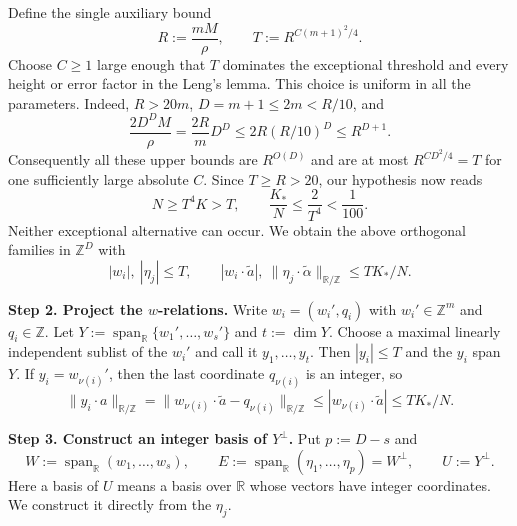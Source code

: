 \documentclass[twoside]{aomart}
\makeatletter
\theoremstyle{paperplain}
\theoremstyle{paperdefinition}
\renewenvironment{proof}[1][\proofname]{\par\pushQED{\qed}%
  \normalfont\topsep6\p@\@plus3\p@\relax\trivlist
  \item[\hskip\labelsep\itshape #1\@addpunct{.}]\ignorespaces
}{\popQED\endtrivlist\@endpefalse}
\numberwithin{equation}{section}
\makeatother
\begin{document}
\begin{proof}
Define the single auxiliary bound
\begin{equation*}
 R:=\frac{mM}{\rho},\qquad T:=R^{C(m+1)^2/4}.
\end{equation*}
Choose $C\ge1$ large enough that $T$ dominates the exceptional
threshold and every height or error factor in the Leng's lemma.
This choice is uniform in all the parameters. Indeed, $R>20m$,
$D=m+1\le2m<R/10$, and
\begin{equation*}
 \frac{2D^DM}{\rho}
 =\frac{2R}{m}D^D
 \le 2R(R/10)^D\le R^{D+1}.
\end{equation*}
Consequently all these upper bounds are $R^{O(D)}$ and are
at most $R^{CD^2/4}=T$ for one sufficiently large absolute $C$.
Since $T\ge R>20$, our hypothesis now reads
\begin{equation*}
 N\ge T^4K>T,\qquad \frac{K_*}{N}\le\frac2{T^4}<\frac1{100}.
\end{equation*}
Neither exceptional alternative can occur. We obtain the above
orthogonal families in $\mathbb Z^D$ with
\begin{equation}
 |w_i|,\ |\eta_j|\le T,\qquad
 |w_i\cdot\widetilde a|,\
 \|\eta_j\cdot\widetilde\alpha\|_{\mathbb R/\mathbb Z}
 \le TK_*/N.
 \label{inv:eq:lem76-leng}
\end{equation}

\par
\medskip
\noindent\textbf{Step 2. Project the $w$-relations.}
Write $w_i=(w_i',q_i)$ with $w_i'\in\mathbb Z^m$ and $q_i\in\mathbb Z$.
Let $Y:=\operatorname{span}_{\mathbb R}\{w_1',\ldots,w_s'\}$ and
$t:=\dim Y$.  Choose a maximal linearly independent sublist of the
$w_i'$ and call it $y_1,\ldots,y_t$.  Then $|y_i|\le T$ and the $y_i$
span $Y$.  If $y_i=w_{\nu(i)}'$, then the last coordinate $q_{\nu(i)}$
is an integer, so
\begin{equation*}
 \|y_i\cdot a\|_{\mathbb R/\mathbb Z}
 =\|w_{\nu(i)}\cdot\widetilde a-q_{\nu(i)}\|_{\mathbb R/\mathbb Z}
 \le |w_{\nu(i)}\cdot\widetilde a|\le TK_*/N.
\end{equation*}

\par
\medskip
\noindent\textbf{Step 3. Construct an integer basis of $Y^\perp$.}
Put $p:=D-s$ and
\begin{equation*}
 W:=\operatorname{span}_{\mathbb R}(w_1,\ldots,w_s),\qquad
 E:=\operatorname{span}_{\mathbb R}(\eta_1,\ldots,\eta_p)=W^\perp,
 \qquad U:=Y^\perp.
\end{equation*}
Here a basis of $U$ means a basis over $\mathbb R$ whose vectors have
integer coordinates. We construct it directly from the $\eta_j$.


\end{proof}
\end{document}

